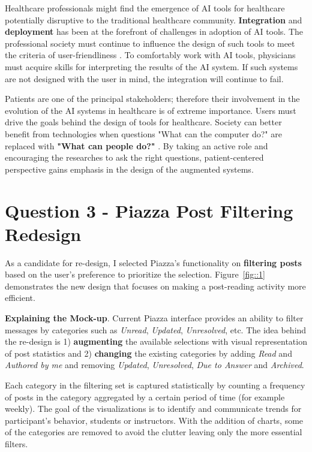 \documentclass[12pt,letterpaper]{article}
\begin{document}
Healthcare professionals might find the emergence of AI tools for healthcare potentially disruptive to the traditional healthcare community. \textbf{Integration} and \textbf{deployment} has been at the forefront of challenges in adoption of AI tools. The professional society must continue to influence the design of such tools to meet the criteria of user-friendliness \cite{heathfield1993philosophies}. To comfortably work with AI tools, physicians must acquire skills for interpreting the results of the AI system. If such systems are not designed with the user in mind, the integration will continue to fail. 

Patients are one of the principal stakeholders; therefore their involvement in the evolution of the AI systems in healthcare is of extreme importance. Users must drive the goals behind the design of tools for healthcare. Society can better benefit from technologies when questions "What can the computer do?" are replaced with \textbf{"What can people do?"} \cite{hesse2007ehealth}. By taking an active role and encouraging the researches to ask the right questions, patient-centered perspective gains emphasis in the design of the augmented systems. 

\section*{Question 3 - Piazza Post Filtering Redesign}

As a candidate for re-design, I selected Piazza's functionality on \textbf{filtering posts} based on the user's preference to prioritize the selection. Figure~\ref{fig::1} demonstrates the new design that focuses on making a post-reading activity more efficient. 

\textbf{Explaining the Mock-up}. Current Piazza interface provides an ability to filter messages by categories such as \textit{Unread}, \textit{Updated}, \textit{Unresolved}, etc. The idea behind the re-design is 1) \textbf{augmenting} the available selections with visual representation of post statistics and 2) \textbf{changing} the existing categories by adding \textit{Read} and \textit{Authored by me} and removing \textit{Updated}, \textit{Unresolved}, \textit{Due to Answer} and \textit{Archived}.

Each category in the filtering set is captured statistically by counting a frequency of posts in the category aggregated by a certain period of time (for example weekly). The goal of the visualizations is to identify and communicate trends for participant's behavior, students or instructors. With the addition of charts, some of the categories are removed to avoid the clutter leaving only the more essential filters. 
\end{document}
